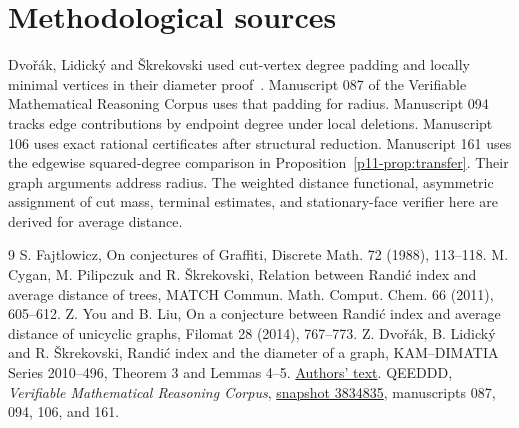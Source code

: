\documentclass[11pt,a4paper]{article}
\newcommand{\volappendix}{\setcounter{section}{0}\setcounter{subsection}{0}\volumeappendixtrue\renewcommand{\thesection}{\Alph{section}}}
\begin{document}
\section*{Methodological sources}
Dvo\v{r}\'ak, Lidick\'y and \v{S}krekovski used cut-vertex degree padding and locally minimal vertices in their diameter proof~\cite{p11-DLS}. Manuscript 087 of the Verifiable Mathematical Reasoning Corpus uses that padding for radius. Manuscript 094 tracks edge contributions by endpoint degree under local deletions. Manuscript 106 uses exact rational certificates after structural reduction. Manuscript 161 uses the edgewise squared-degree comparison in Proposition~\ref{p11-prop:transfer}. Their graph arguments address radius. The weighted distance functional, asymmetric assignment of cut mass, terminal estimates, and stationary-face verifier here are derived for average distance.
\begin{thebibliography}{9}
 S. Fajtlowicz, On conjectures of Graffiti, Discrete Math. 72 (1988), 113--118.
 M. Cygan, M. Pilipczuk and R. \v{S}krekovski, Relation between Randi\'c index and average distance of trees, MATCH Commun. Math. Comput. Chem. 66 (2011), 605--612.
 Z. You and B. Liu, On a conjecture between Randi\'c index and average distance of unicyclic graphs, Filomat 28 (2014), 767--773.
 Z. Dvo\v{r}\'ak, B. Lidick\'y and R. \v{S}krekovski, Randi\'c index and the diameter of a graph, KAM--DIMATIA Series 2010--496, Theorem 3 and Lemmas 4--5. \href{https://iti.mff.cuni.cz/series/2010/496.pdf}{Authors' text}.
 QEEDDD, \emph{Verifiable Mathematical Reasoning Corpus},
\href{https://github.com/QEEDDD/Verifiable-Mathematical-Reasoning-Corpus/tree/38348353416f1f7fc50cecb93c3b554a00260c13}{snapshot 3834835}, manuscripts 087, 094, 106, and 161.
\end{thebibliography}
\clearpage\volappendix
\end{document}
